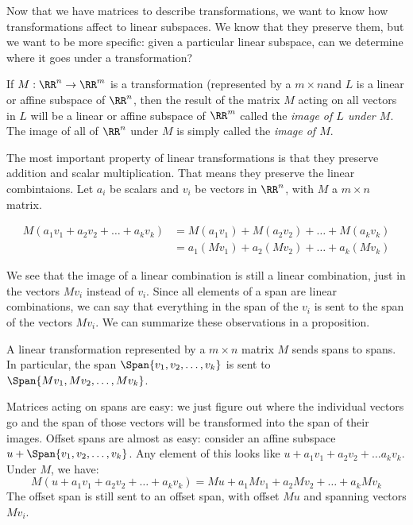 \documentclass[fleqn]{report}
\begin{document}
Now that we have matrices to describe transformations, we want
to know how transformations affect to linear subspaces. We know
that they preserve them, but we want to be more specific:
given a particular linear subspace, can we determine where it
goes under a transformation?

\begin{defn}
If $M: \RR^n \rightarrow \RR^m$ is a transformation
(represented by a $m \times n$and $L$ is
a linear or affine subspace of $\RR^n$, then the result of the
matrix $M$ acting on all vectors in $L$ will be a linear or
affine subspace of $\RR^m$ called the \emph{image of $L$ under
$M$}. The image of all of $\RR^n$ under $M$ is simply called
the \emph{image of $M$}.
\end{defn}

The most important property of linear transformations is that
they preserve addition and scalar multiplication. That means
they preserve the linear combintaions. Let $a_i$ be
scalars and $v_i$ be vectors in $\RR^n$, with $M$ a $m\times
n$ matrix.

\begin{align*}
M(a_1 v_1 + a_2v_2 + \ldots + a_kv_k) & = M(a_1v_1) + M(a_2v_2)
+ \ldots + M(a_kv_k) \\
& = a_1(Mv_1) + a_2(Mv_2) + \ldots + a_k
(Mv_k)
\end{align*}

We see that the image of a linear combination is still a
linear combination, just in the vectors $Mv_i$ instead of
$v_i$. Since all elements of a span are linear combinations,
we can say that everything in the span of the $v_i$ is sent to
the span of the vectors $Mv_i$. We can summarize these
observations in a proposition.

\begin{prop}
A linear transformation represented by a $m \times n$ matrix
$M$ sends spans to spans. In particular, the span $\Span \{
v_1, v_2, \ldots, v_k\}$ is sent to $\Span \{ Mv_1, Mv_2,
\ldots, Mv_k\}$.
\end{prop}

Matrices acting on spans are easy: we just figure out where
the individual vectors go and the span of those vectors will be
transformed into the span of their images. Offset spans are
almost as easy: consider an affine subspace $u + \Span \{
v_1, v_2, \ldots, v_k\}$. Any element of this looks like $u +
a_1v_1 + a_2v_2 + \ldots a_kv_k$. Under $M$, we have:
\begin{equation*}
M(u + a_1v_1 + a_2v_2 + \ldots + a_kv_k) = Mu + a_1 Mv_1 +
a_2Mv_2 + \ldots + a_kMv_k
\end{equation*}
The offset span is still sent to an offset span, with offset
$Mu$ and spanning vectors $Mv_i$. 
\end{document}
